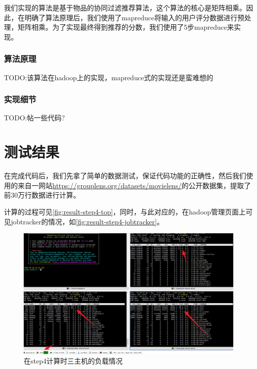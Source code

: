 \documentclass[forprint]{myreport}
\begin{document}
我们实现的算法是基于物品的协同过滤推荐算法，这个算法的核心是矩阵相乘。因此，在明确了算法原理后，我们使用了mapreduce将输入的用户评分数据进行预处理，矩阵相乘。为了实现最终得到推荐的分数，我们使用了5步mapreduce来实现。

\subsection{算法原理}

TODO:该算法在hadoop上的实现，mapreduce式的实现还是蛮难想的

\subsection{实现细节}


TODO:帖一些代码?

\chapter{测试结果}

在完成代码后，我们先拿了简单的数据测试，保证代码功能的正确性，然后我们使用的来自一网站\url{https://grouplens.org/datasets/movielens/}的公开数据集，提取了前30万行数据进行计算。

计算的过程可见\autoref{fig:result-step4-top}，同时，与此对应的，在hadoop管理页面上可见jobtracker的情况，如\autoref{fig:result-step4-jobtracker}。

\begin{figure}[htp]
  \centering
  \includegraphics[width=13cm]{"./figure/2018-07-03-14-41-38.png"}
  \caption{在step4计算时三主机的负载情况}
  \label{fig:result-step4-top}
\end{figure}
\end{document}
